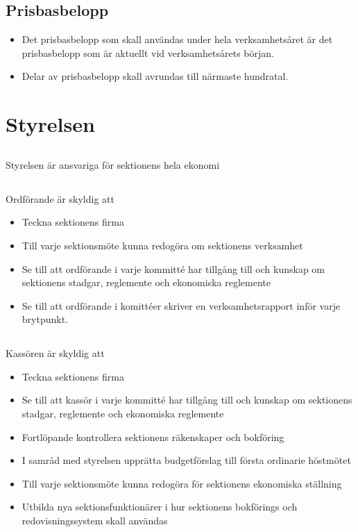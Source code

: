 \documentclass[a4paper, 10pt]{article}
\begin{document}
\subsection{Prisbasbelopp}
\begin{itemize}
  \item Det prisbasbelopp som skall användas under hela verksamhetsåret är det prisbasbelopp som är aktuellt vid verksamhetsårets början.
  \item Delar av prisbasbelopp skall avrundas till närmaste hundratal. 
\end{itemize}

\section{Styrelsen}
\subsection{}
Styrelsen är ansvariga för sektionens hela ekonomi
\subsection{}
Ordförande är skyldig att
\begin{itemize}
  \item Teckna sektionens firma
  \item Till varje sektionsmöte kunna redogöra om sektionens verksamhet
  \item Se till att ordförande i varje kommitté har tillgång till och kunskap om sektionens stadgar, reglemente och ekonomiska reglemente
  \item Se till att ordförande i komittéer skriver en verksamhetsrapport inför varje brytpunkt.
\end{itemize}
\subsection{}
Kassören är skyldig att
\begin{itemize}
  \item Teckna sektionens firma
  \item Se till att kassör i varje kommitté har tillgång till och kunskap om sektionens stadgar, reglemente och ekonomiska reglemente 
  \item Fortlöpande kontrollera sektionens räkenskaper och bokföring
  \item I samråd med styrelsen upprätta budgetförslag till första ordinarie höstmötet
  \item Till varje sektionsmöte kunna redogöra för sektionens ekonomiska ställning
  \item Utbilda nya sektionsfunktionärer i hur sektionens bokförings och redovisningssystem skall användas
\end{itemize}
\end{document}
